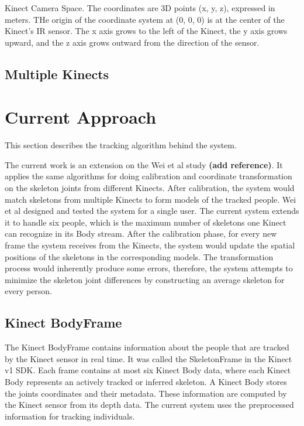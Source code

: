 \documentclass{sigchi}
\begin{document}
Kinect Camera Space. The coordinates are 3D points (x, y, z), expressed in meters. THe origin of the coordinate system at (0, 0, 0) is at the center of the Kinect's IR sensor. The x axis grows to the left of the Kinect, the y axis grows upward, and the z axis grows outward from the direction of the sensor.

\cite{microsoft_kinect_coordinates}

\subsection{Multiple Kinects}

\section{Current Approach}
\label{sec:current_approach}

This section describes the tracking algorithm behind the system.

The current work is an extension on the Wei et al study \textbf{(add reference)}. It applies the same algorithms for doing calibration and coordinate transformation on the skeleton joints from different Kinects. After calibration, the system would match skeletons from multiple Kinects to form models of the tracked people. Wei et al designed and tested the system for a single user. The current system extends it to handle six people, which is the maximum number of skeletons one Kinect can recognize in its Body stream. After the calibration phase, for every new frame the system receives from the Kinects, the system would update the spatial positions of the skeletons in the corresponding models. The transformation process would inherently produce some errors, therefore, the system attempts to minimize the skeleton joint differences by constructing an average skeleton for every person.

\subsection{Kinect BodyFrame}

The Kinect BodyFrame contains information about the people that are tracked by the Kinect sensor in real time. It was called the SkeletonFrame in the Kinect v1 SDK. Each frame contains at most six Kinect Body data, where each Kinect Body represents an actively tracked or inferred skeleton. A Kinect Body stores the joints coordinates and their metadata. These information are computed by the Kinect sensor from its depth data. The current system uses the preprocessed information for tracking individuals.
\end{document}

